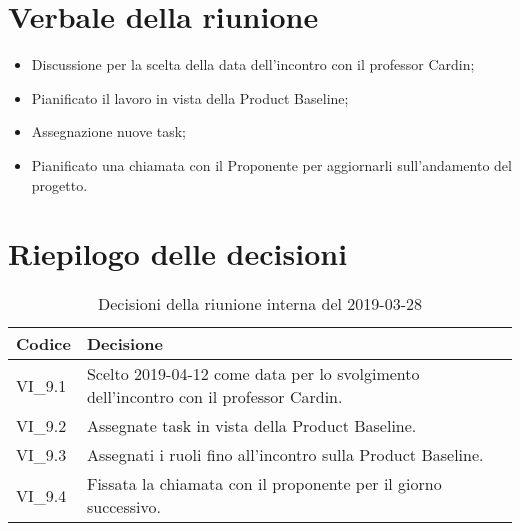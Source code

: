\section{Verbale della riunione}
\begin{itemize}
	\item Discussione per la scelta della data dell'incontro con il professor 
	Cardin;
	\item Pianificato il lavoro in vista della Product Baseline\glo;
	\item Assegnazione nuove task;
	\item Pianificato una chiamata con il Proponente per aggiornarli 
	sull'andamento del progetto.
	
\end{itemize}

\hspace{3cm}

\section{Riepilogo delle decisioni}

	
	\begin{longtable}{ >{\centering}p{} >{}p{}}
		\caption{Decisioni della riunione interna del 2019-03-28}\\	
		\rowcolorhead
		\textbf{\color{white}Codice} 
		& \centering\textbf{\color{white}Decisione} 
		\tabularnewline 
		\endfirsthead
		VI\_9.1 & Scelto 2019-04-12 come data per lo svolgimento dell'incontro 
		con il professor Cardin.
		\tabularnewline 
		VI\_9.2 & Assegnate task in vista della Product Baseline.
		\tabularnewline
		VI\_9.3 & Assegnati i ruoli fino all'incontro sulla Product Baseline.
		\tabularnewline
		VI\_9.4 & Fissata la chiamata con il proponente per il giorno successivo.\\
	\end{longtable}
	




